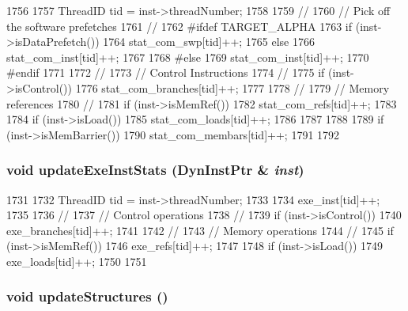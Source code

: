 \begin{DoxyCode}
1756 {
1757     ThreadID tid = inst->threadNumber;
1758 
1759     //
1760     //  Pick off the software prefetches
1761     //
1762 #ifdef TARGET_ALPHA
1763     if (inst->isDataPrefetch()) {
1764         stat_com_swp[tid]++;
1765     } else {
1766         stat_com_inst[tid]++;
1767     }
1768 #else
1769     stat_com_inst[tid]++;
1770 #endif
1771 
1772     //
1773     //  Control Instructions
1774     //
1775     if (inst->isControl())
1776         stat_com_branches[tid]++;
1777 
1778     //
1779     //  Memory references
1780     //
1781     if (inst->isMemRef()) {
1782         stat_com_refs[tid]++;
1783 
1784         if (inst->isLoad()) {
1785             stat_com_loads[tid]++;
1786         }
1787     }
1788 
1789     if (inst->isMemBarrier()) {
1790         stat_com_membars[tid]++;
1791     }
1792 }
\end{DoxyCode}
\hypertarget{classBackEnd_a132db67a5c42af856da64e347e8284d8}{
\subsubsection[{updateExeInstStats}]{\setlength{\rightskip}{0pt plus 5cm}void updateExeInstStats ({\bf DynInstPtr} \& {\em inst})}}
\label{classBackEnd_a132db67a5c42af856da64e347e8284d8}



\begin{DoxyCode}
1731 {
1732     ThreadID tid = inst->threadNumber;
1733 
1734     exe_inst[tid]++;
1735 
1736     //
1737     //  Control operations
1738     //
1739     if (inst->isControl())
1740         exe_branches[tid]++;
1741 
1742     //
1743     //  Memory operations
1744     //
1745     if (inst->isMemRef()) {
1746         exe_refs[tid]++;
1747 
1748         if (inst->isLoad())
1749             exe_loads[tid]++;
1750     }
1751 }
\end{DoxyCode}
\hypertarget{classBackEnd_a1107d388cfcea92a9043608346ce98f0}{
\subsubsection[{updateStructures}]{\setlength{\rightskip}{0pt plus 5cm}void updateStructures ()}}
\label{classBackEnd_a1107d388cfcea92a9043608346ce98f0}



